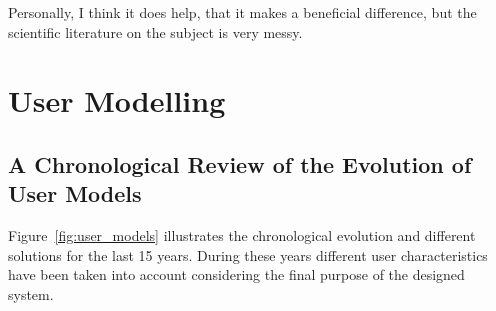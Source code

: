

\begin{savequote}[50mm]
Personally, I think it does help, that it makes a beneficial difference, but the scientific literature on the subject is very messy.
%
\end{savequote}


\section{User Modelling}
\label{sec:user}

\ifpdf
    \graphicspath{{2_state_of_the_art/figures/PNG/}{2_state_of_the_art/figures/PDF/}{2_state_of_the_art/figures/}}
\else
    \graphicspath{{2_state_of_the_art/figures/EPS/}{2_state_of_the_art/figures/}}
\fi



\subsection{A Chronological Review of the Evolution of User Models}
\label{sec:chronological_review}

Figure~\ref{fig:user_models} illustrates the chronological evolution and different 
solutions for the last 15 years. During these years different user characteristics 
have been taken into account considering the final purpose of the designed system. 

\vspace{1cm}
\setlength\taskwidth{1.7cm}

\begin{timeline}
  \label{chr:users}
\end{timeline}


